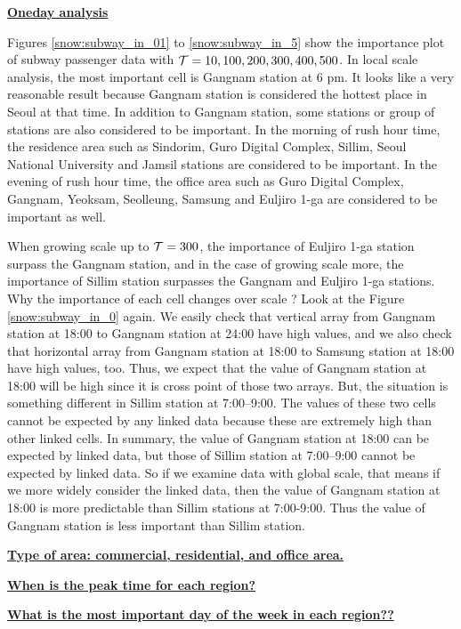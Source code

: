 \documentclass[preprint, review, 12pt]{article}
\theoremstyle{definition}
\theoremstyle{remark}
\begin{document}
\noindent\textbf{\underline{Oneday analysis}}

Figures \ref{snow:subway_in_01} to \ref{snow:subway_in_5} show the importance plot of subway passenger data with ${\cal T}=10,100,200,300,400,500$. In local scale analysis, the most important cell is Gangnam station at 6 pm. It looks like a very reasonable result because Gangnam station is considered the hottest place in Seoul at that time. In addition to Gangnam station, some stations or group of stations are also considered to be important. In the morning of rush hour time, the residence area such as Sindorim, Guro Digital Complex, Sillim, Seoul National University and Jamsil stations are considered to be important. In the evening of rush hour time, the office area such as Guro Digital Complex, Gangnam, Yeoksam, Seolleung, Samsung and Euljiro 1-ga are considered to be important as well. 

When growing scale up to ${\cal T}=300$, the importance of Euljiro 1-ga station surpass the Gangnam station, and in the case of  growing scale more, the importance of Sillim station surpasses the Gangnam and Euljiro 1-ga stations. Why the importance of each cell changes over scale ? Look at the Figure \ref{snow:subway_in_0} again. We easily check that vertical array from Gangnam station at 18:00 to Gangnam station at 24:00 have high values, and we also check that horizontal array from Gangnam station at 18:00 to Samsung station at 18:00 have high values, too. Thus, we expect that the value of Gangnam station at 18:00 will be high since it is cross point of those two arrays. But, the situation is something different in Sillim station at 7:00--9:00. The values of these two cells cannot be expected by any linked data because these are extremely high than other linked cells. In summary, the value of Gangnam station at 18:00 can be expected by linked data, but those of Sillim station at 7:00--9:00 cannot be expected by linked data. So if we examine data with global scale, that means if we more widely consider the linked data, then the value of Gangnam station at 18:00 is more predictable than Sillim stations at 7:00-9:00. Thus the value of Gangnam station is less important than Sillim station.

\noindent\textbf{\underline{Type of area: commercial, residential, and office area.}}

\noindent\textbf{\underline{When is the peak time for each region?}}

\noindent\textbf{\underline{What is the most important day of the week in each region??}}
\end{document}
